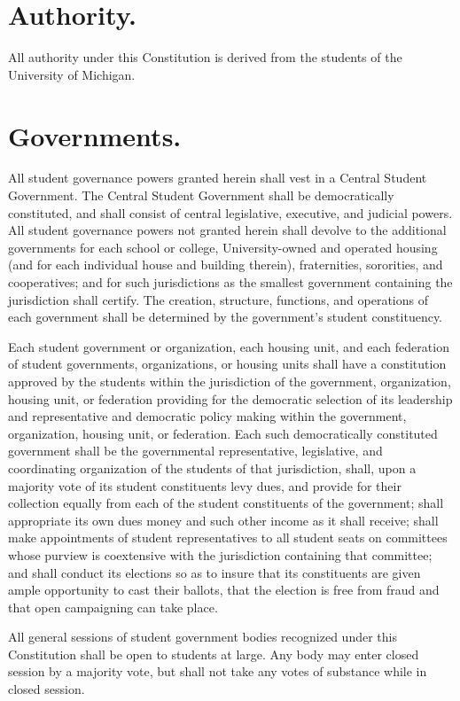 \section{Authority.}
    All authority under this Constitution is derived from the students of the University of Michigan.

\section{Governments.}
    All student governance powers granted herein shall vest in a Central Student Government. The Central Student Government shall be democratically constituted, and shall consist of central legislative, executive, and judicial powers. All student governance powers not granted herein shall devolve to the additional governments for each school or college, University-owned and operated housing (and for each individual house and building therein), fraternities, sororities, and cooperatives; and for such jurisdictions as the smallest government containing the jurisdiction shall certify. The creation, structure, functions, and operations of each government shall be determined by the government's student constituency.

    Each student government or organization, each housing unit, and each federation of student governments, organizations, or housing units shall have a constitution approved by the students within the jurisdiction of the government, organization, housing unit, or federation providing for the democratic selection of its leadership and representative and democratic policy making within the government, organization, housing unit, or federation. Each such democratically constituted government shall be the governmental representative, legislative, and coordinating organization of the students of that jurisdiction, shall, upon a majority vote of its student constituents levy dues, and provide for their collection equally from each of the student constituents of the government; shall appropriate its own dues money and such other income as it shall receive; shall make appointments of student representatives to all student seats on committees whose purview is coextensive with the jurisdiction containing that committee; and  shall conduct its elections so as to insure that its constituents are given ample opportunity to cast their ballots, that the election is free from fraud and that open campaigning can take place.

    All general sessions of student government bodies recognized under this Constitution shall be open to students at large. Any body may enter closed session by a majority vote, but shall not take any votes of substance while in closed session.
  
